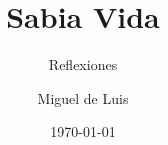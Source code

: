 \documentclass[a4paper,twoside=false,12pt,spanish,DIV=7]{scrbook}
\title{Sabia Vida}
\subtitle{Reflexiones}
\author{Miguel de Luis}
\date{\today} %
\begin{document}

\frontmatter
\maketitle       %
\listoftodos     %
\tableofcontents %




\mainmatter


\end{document}
